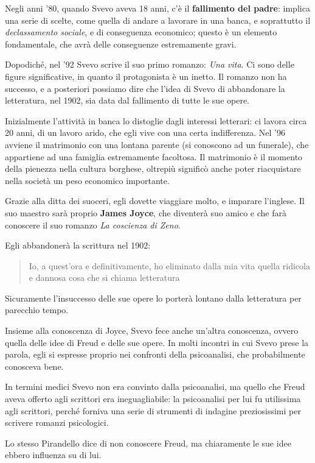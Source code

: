 \documentclass[a4paper, twoside, titlepage]{book}
\newcommand{\citazione}[1]{%
  \begin{quotation}
  \noindent #1
  \end{quotation}}
\begin{document}
Negli anni '80, quando Svevo aveva 18 anni, c'è il \textbf{fallimento del padre}: implica una serie di scelte, come quella di andare a lavorare in una banca, e soprattutto il \textit{declassamento sociale}, e di conseguenza economico; questo è un elemento fondamentale, che avrà delle conseguenze estremamente gravi.

Dopodiché, nel '92 Svevo scrive il suo primo romanzo: \textit{Una vita}.
Ci sono delle figure significative, in quanto il protagonista è un inetto.
Il romanzo non ha successo, e a posteriori possiamo dire che l'idea di Svevo di abbandonare la letteratura, nel 1902, sia data dal fallimento di tutte le sue opere.

Inizialmente l'attività in banca lo distoglie dagli interessi letterari: ci lavora circa 20 anni, di un lavoro arido, che egli vive con una certa indifferenza.
Nel '96 avviene il matrimonio con una lontana parente (si conoscono ad un funerale), che appartiene ad una famiglia estremamente facoltosa.
Il matrimonio è il momento della pienezza nella cultura borghese, oltrepiù significò anche poter riacquistare nella società un peso economico importante.

Grazie alla ditta dei suoceri, egli dovette viaggiare molto, e imparare l'inglese. Il suo maestro sarà proprio \textbf{James Joyce}, che diventerà suo amico e che farà conoscere il suo romanzo \textit{La coscienza di Zeno}.

Egli abbandonerà la scrittura nel 1902:
\citazione{Io, a quest'ora e definitivamente, ho eliminato dalla mia vita quella ridicola e dannosa cosa che si chiama letteratura}

Sicuramente l'insuccesso delle sue opere lo porterà lontano dalla letteratura per parecchio tempo.

Insieme alla conoscenza di Joyce, Svevo fece anche un'altra conoscenza, ovvero quella delle idee di Freud e delle sue opere.
In molti incontri in cui Svevo prese la parola, egli si espresse proprio nei confronti della psicoanalisi, che probabilmente conosceva bene.

In termini medici Svevo non era convinto dalla psicoanalisi, ma quello che Freud aveva offerto agli scrittori era ineguagliabile: la psicoanalisi per lui fu utilissima agli scrittori, perché forniva una serie di strumenti di indagine preziosissimi per scrivere romanzi psicologici.

Lo stesso Pirandello dice di non conoscere Freud, ma chiaramente le sue idee ebbero influenza su di lui.
\end{document}
